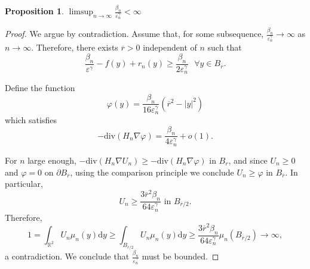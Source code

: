 \documentclass[10pt,a4paper]{article}
\newcommand{\RR}{\mathbb{R}}
\newcommand{\divg}{\mathrm{div}}
\newcommand{\faskip}{\hspace{8pt}}
\newtheorem{prop}[thm]{Proposition}
\numberwithin{equation}{section}
\begin{document}
\begin{prop}
	\label{prop:nondeg_q_bound}
	$ \limsup_{n\rightarrow \infty} \frac{\beta_n}{\varepsilon_n^{\gamma}} < \infty$
\end{prop}

\begin{proof}
	We argue by contradiction. Assume that, for some subsequence, $ \frac{\beta_n}{\varepsilon_n^{\gamma}} \rightarrow \infty $ as $n\rightarrow \infty$. Therefore, there exists $ \overline{r}> 0 $ independent of $ n $ such that 
	\[\frac{\beta_n}{\varepsilon^{\gamma}} - f(y) + r_n(y) \geq \frac{\beta_n}{2\varepsilon_n^{\gamma}} \faskip \forall y\in B_{\overline{r}}.\]
	
	Define the function
	\[
		\varphi(y) = \frac{\beta_n}{16 \varepsilon_n^{\gamma}} \left( \overline{r}^{2} - |y|^{2} \right) 
	\]
	which satisfies
	\[
		-\divg(H_n \nabla \varphi) = \frac{\beta_n}{4 \varepsilon_n^{\gamma}} + o(1).
	\]
	
	For $n$ large enough, $-\divg(H_n \nabla U_n) \geq -\divg(H_n \nabla \varphi)$ in $B_r$, and since $U_n \geq 0$ and $\varphi = 0$ on $ \partial B_{\overline{r}} $, using the comparison principle we conclude $U_n \geq \varphi$ in $ B_{\overline{r}} $. In particular,
	\[U_n \geq \frac{3 \overline{r}^{2}\beta_n}{64 \varepsilon_n^{\gamma}} \text{ in }B_{\overline{r}/2}.\]
Therefore,
\[1 = \int_{\RR^{2}} U_n \mu_n(y)\mathrm{d}y \geq \int_{B_{\overline{r}/2}} U_n \mu_n(y) \mathrm{d}y \geq \frac{3 \overline{r}^{2}\beta_n}{64 \varepsilon_n^{\gamma}} \mu_n(B_{\overline{r}/2}) \rightarrow \infty, \]
a contradiction. We conclude that $\frac{\beta_n}{\varepsilon_n^{\gamma}}$ must be bounded.
\end{proof}
\end{document}
